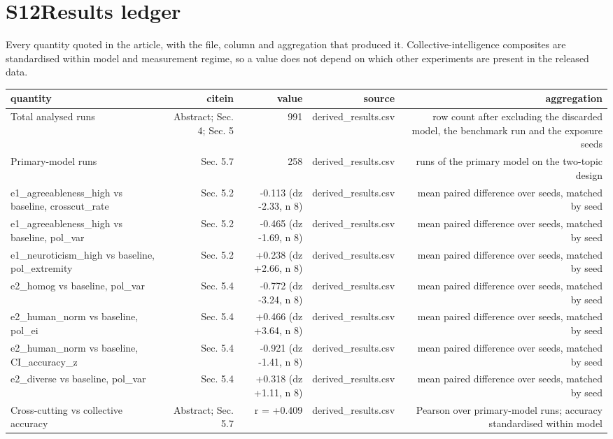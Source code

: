 \documentclass[11pt]{article}
\begin{document}
\medskip

\section*{S12\quad Results ledger}
Every quantity quoted in the article, with the file, column and aggregation that produced it. Collective-intelligence composites are standardised within model and measurement regime, so a value does not depend on which other experiments are present in the released data.
\tiny
\setlength{\tabcolsep}{2.5pt}
\begin{longtable}{@{}lrrrr@{}}
\toprule
quantity & citein & value & source & aggregation \\
\midrule
\endhead
Total analysed runs & Abstract; Sec. 4; Sec. 5 & 991 & derived\_results.csv & row count after excluding the discarded model, the benchmark run and the exposure seeds \\
Primary-model runs & Sec. 5.7 & 258 & derived\_results.csv & runs of the primary model on the two-topic design \\
e1\_agreeableness\_high vs baseline, crosscut\_rate & Sec. 5.2 & -0.113 (dz -2.33, n 8) & derived\_results.csv & mean paired difference over seeds, matched by seed \\
e1\_agreeableness\_high vs baseline, pol\_var & Sec. 5.2 & -0.465 (dz -1.69, n 8) & derived\_results.csv & mean paired difference over seeds, matched by seed \\
e1\_neuroticism\_high vs baseline, pol\_extremity & Sec. 5.2 & +0.238 (dz +2.66, n 8) & derived\_results.csv & mean paired difference over seeds, matched by seed \\
e2\_homog vs baseline, pol\_var & Sec. 5.4 & -0.772 (dz -3.24, n 8) & derived\_results.csv & mean paired difference over seeds, matched by seed \\
e2\_human\_norm vs baseline, pol\_ei & Sec. 5.4 & +0.466 (dz +3.64, n 8) & derived\_results.csv & mean paired difference over seeds, matched by seed \\
e2\_human\_norm vs baseline, CI\_accuracy\_z & Sec. 5.4 & -0.921 (dz -1.41, n 8) & derived\_results.csv & mean paired difference over seeds, matched by seed \\
e2\_diverse vs baseline, pol\_var & Sec. 5.4 & +0.318 (dz +1.11, n 8) & derived\_results.csv & mean paired difference over seeds, matched by seed \\
Cross-cutting vs collective accuracy & Abstract; Sec. 5.7 & r = +0.409 & derived\_results.csv & Pearson over primary-model runs; accuracy standardised within model \\

\end{longtable}
\end{document}
